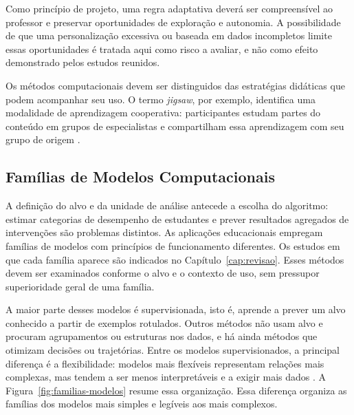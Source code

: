 Como princípio de projeto, uma regra adaptativa deverá ser compreensível ao professor e preservar oportunidades de exploração e autonomia. A possibilidade de que uma personalização excessiva ou baseada em dados incompletos limite essas oportunidades é tratada aqui como risco a avaliar, e não como efeito demonstrado pelos estudos reunidos.

Os métodos computacionais devem ser distinguidos das estratégias didáticas que podem acompanhar seu uso. O termo \textit{jigsaw}, por exemplo, identifica uma modalidade de aprendizagem cooperativa: participantes estudam partes do conteúdo em grupos de especialistas e compartilham essa aprendizagem com seu grupo de origem \cite{JigsawClassroom}.

\subsection{Famílias de Modelos Computacionais}
\label{sec:fund-modelos}

A definição do alvo e da unidade de análise antecede a escolha do algoritmo: estimar categorias de desempenho de estudantes e prever resultados agregados de intervenções são problemas distintos. As aplicações educacionais empregam famílias de modelos com princípios de funcionamento diferentes. Os estudos em que cada família aparece são indicados no Capítulo~\ref{cap:revisao}. Esses métodos devem ser examinados conforme o alvo e o contexto de uso, sem pressupor superioridade geral de uma família.

A maior parte desses modelos é supervisionada, isto é, aprende a prever um alvo conhecido a partir de exemplos rotulados. Outros métodos não usam alvo e procuram agrupamentos ou estruturas nos dados, e há ainda métodos que otimizam decisões ou trajetórias. Entre os modelos supervisionados, a principal diferença é a flexibilidade: modelos mais flexíveis representam relações mais complexas, mas tendem a ser menos interpretáveis e a exigir mais dados \cite{James2021}. A Figura~\ref{fig:familias-modelos} resume essa organização. Essa diferença organiza as famílias dos modelos mais simples e legíveis aos mais complexos.



